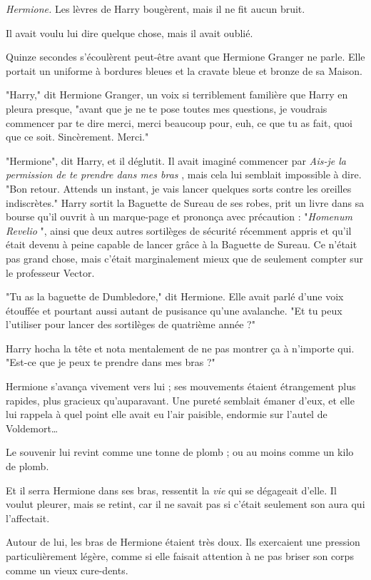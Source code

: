 \emph{Hermione.}  Les lèvres de Harry bougèrent, mais il ne fit aucun bruit.

Il avait voulu lui dire quelque chose, mais il avait oublié.

Quinze secondes s'écoulèrent peut-être avant que Hermione Granger ne parle. Elle portait un uniforme à bordures bleues et la cravate bleue et bronze de sa Maison.

"Harry," dit Hermione Granger, un voix si terriblement familière que Harry en pleura presque, "avant que je ne te pose toutes mes questions, je voudrais commencer par te dire merci, merci beaucoup pour, euh, ce que tu as fait, quoi que ce soit. Sincèrement. Merci."

"Hermione", dit Harry, et il déglutit. Il avait imaginé commencer par \emph{Ais-je la permission de te prendre dans mes bras} , mais cela lui semblait impossible à dire. "Bon retour. Attends un instant, je vais lancer quelques sorts contre les oreilles indiscrètes." Harry sortit la Baguette de Sureau de ses robes, prit un livre dans sa bourse qu'il ouvrit à un marque-page et prononça avec précaution : "\emph{Homenum Revelio} ", ainsi que deux autres sortilèges de sécurité récemment appris et qu'il était devenu à peine capable de lancer grâce à la Baguette de Sureau. Ce n'était pas grand chose, mais c'était marginalement mieux que de seulement compter sur le professeur Vector.

"Tu as la baguette de Dumbledore," dit Hermione. Elle avait parlé d'une voix étouffée et pourtant aussi autant de pusisance qu'une avalanche. "Et tu peux l'utiliser pour lancer des sortilèges de quatrième année ?"

Harry hocha la tête et nota mentalement de ne pas montrer ça à n'importe qui. "Est-ce que je peux te prendre dans mes bras ?"

Hermione s'avança vivement vers lui ; ses mouvements étaient étrangement plus rapides, plus gracieux qu'auparavant. Une pureté semblait émaner d'eux, et elle lui rappela à quel point elle avait eu l'air paisible, endormie sur l'autel de Voldemort…

Le souvenir lui revint comme une tonne de plomb ; ou au moins comme un kilo de plomb.

Et il serra Hermione dans ses bras, ressentit la \emph{vie}  qui se dégageait d'elle. Il voulut pleurer, mais se retint, car il ne savait pas si c'était seulement son aura qui l'affectait.

Autour de lui, les bras de Hermione étaient très doux. Ils exercaient une pression particulièrement légère, comme si elle faisait attention à ne pas briser son corps comme un vieux cure-dents.

